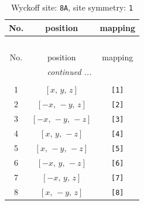\documentclass[fleqn,8pt]{jsarticle}
\begin{document}
\renewcommand{\arraystretch}{1.2}
\begin{longtable}{ccc}
\caption{Wyckoff site: {\tt 8A}, site symmetry: {\tt 1}}
 \\
 \hline \hline
No. & position & mapping \\ \hline \endfirsthead

\multicolumn{2}{l}{\tablename\ \thetable{}} \\
 \hline \hline
No. & position & mapping \\ \hline \endhead

 \hline \hline
\multicolumn{2}{r}{\footnotesize\it continued ...} \\ \endfoot

 \hline \hline
\multicolumn{2}{r}{} \\ \endlastfoot

1 & $\left[ x,\, y,\, z \right]$ & {\tt [1]} \\ \hline
2 & $\left[ - x,\, - y,\, z \right]$ & {\tt [2]} \\ \hline
3 & $\left[ - x,\, - y,\, - z \right]$ & {\tt [3]} \\ \hline
4 & $\left[ x,\, y,\, - z \right]$ & {\tt [4]} \\ \hline
5 & $\left[ x,\, - y,\, - z \right]$ & {\tt [5]} \\ \hline
6 & $\left[ - x,\, y,\, - z \right]$ & {\tt [6]} \\ \hline
7 & $\left[ - x,\, y,\, z \right]$ & {\tt [7]} \\ \hline
8 & $\left[ x,\, - y,\, z \right]$ & {\tt [8]} \\
\end{longtable}
\end{document}
